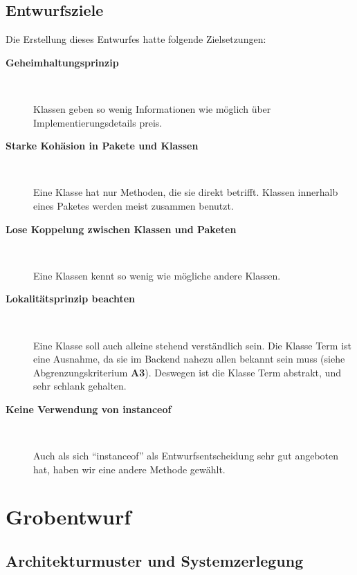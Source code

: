 \documentclass[parskip=full,11pt,twoside]{scrbook}
\begin{document}
\subsection{Entwurfsziele}
Die Erstellung dieses Entwurfes hatte folgende Zielsetzungen:
\begin{description}
	
		\item[\textbf{Geheimhaltungsprinzip}] ~\par
			Klassen geben so wenig Informationen wie möglich über Implementierungsdetails preis.
			
		\item[\textbf{Starke Kohäsion in Pakete und Klassen}] ~\par
			Eine Klasse hat nur Methoden, die sie direkt betrifft. 
            Klassen innerhalb eines Paketes werden meist zusammen benutzt.
			
		\item[\textbf{Lose Koppelung zwischen Klassen und Paketen}]~\par
			Eine Klassen kennt so wenig wie mögliche andere Klassen.
			
		\item[\textbf{Lokalitätsprinzip beachten}] ~\par
			Eine Klasse soll auch alleine stehend verständlich sein.
            Die Klasse Term ist eine Ausnahme, da sie im Backend nahezu allen bekannt sein muss (siehe Abgrenzungskriterium \textbf{A3}).
            Deswegen ist die Klasse Term abstrakt, und sehr schlank gehalten.
			
		\item[\textbf{Keine Verwendung von instanceof}] ~\par
            Auch als sich \enquote{instanceof} als Entwurfsentscheidung sehr gut angeboten hat, haben wir eine andere Methode gewählt.
	
\end{description}
\pagebreak

\section{Grobentwurf}
\subsection{Architekturmuster und Systemzerlegung}
\end{document}

